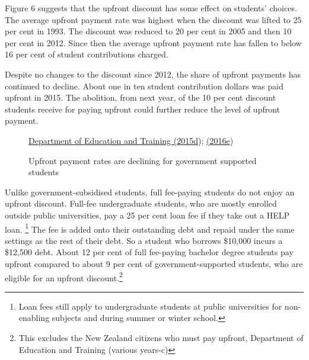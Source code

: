 \documentclass[embargoed]{grattan}
\begin{document}
Figure 6 suggests that the upfront discount has some effect on students' choices. The average upfront payment rate was highest when the discount was lifted to 25 per cent in 1993. The discount was reduced to 20 per cent in 2005 and then 10 per cent in 2012. Since then the average upfront payment rate has fallen to below 16 per cent of student contributions charged.

Despite no changes to the discount since 2012, the share of upfront payments has continued to decline. About one in ten student contribution dollars was paid upfront in 2015. The abolition, from next year, of the 10 per cent discount students receive for paying upfront could further reduce the level of upfront payment.


\begin{figure}
\caption{Upfront payment rates are declining for government supported students}\label{fig:fig6-upfront-payment-rates-are-declining-for-govt-supported-students}


{\protect\hyperlink{_ENREF_27}{Department of Education and Training (2015d}); \protect\hyperlink{_ENREF_33}{(2016e})}
\end{figure}

Unlike government-subsidised students, full fee-paying students do not enjoy an upfront discount. Full-fee undergraduate students, who are mostly enrolled outside public universities, pay a 25 per cent loan fee if they take out a HELP loan. \footnote{Loan fees still apply to undergraduate students at public universities for non-enabling subjects and during summer or winter school.} The fee is added onto their outstanding debt and repaid under the same settings as the rest of their debt. So a student who borrows \$10,000 incurs a \$12,500 debt. About 12 per cent of full fee-paying bachelor degree students pay upfront compared to about 9 per cent of government-supported students, who are eligible for an upfront discount.\footnote{This excludes the New Zealand citizens who must pay upfront, Department of Education and Training (various years-c)}
\end{document}
